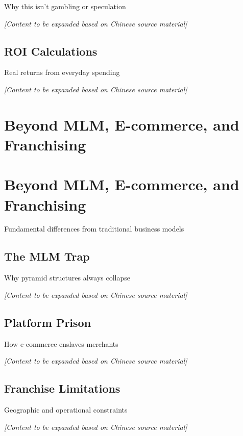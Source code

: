\documentclass[
  Letterpaper,
]{scrbook}
\begin{document}
Why this isn't gambling or speculation

\emph{{[}Content to be expanded based on Chinese source material{]}}

\section{ROI Calculations}\label{roi-calculations}

Real returns from everyday spending

\emph{{[}Content to be expanded based on Chinese source material{]}}

\chapter{Beyond MLM, E-commerce, and
Franchising}\label{beyond-mlm-e-commerce-and-franchising}

\chapter{Beyond MLM, E-commerce, and
Franchising}\label{sec-beyond-traditional}

Fundamental differences from traditional business models

\section{The MLM Trap}\label{the-mlm-trap}

Why pyramid structures always collapse

\emph{{[}Content to be expanded based on Chinese source material{]}}

\section{Platform Prison}\label{platform-prison}

How e-commerce enslaves merchants

\emph{{[}Content to be expanded based on Chinese source material{]}}

\section{Franchise Limitations}\label{franchise-limitations}

Geographic and operational constraints

\emph{{[}Content to be expanded based on Chinese source material{]}}
\end{document}
